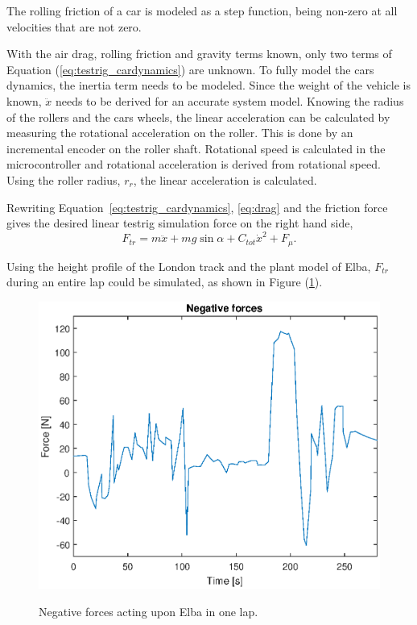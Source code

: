 The rolling friction of a car is modeled as a step function, being non-zero at
all velocities that are not zero.

With the air drag, rolling friction and gravity terms known, only two terms of
Equation (\ref{eq:testrig_cardynamics}) are unknown. To fully model the cars
dynamics, the inertia term needs to be modeled. Since the weight of the vehicle
is known, $\ddot{x}$ needs to be derived for an accurate system model.
Knowing the radius of the rollers and the cars wheels, the linear acceleration
can be calculated by measuring the rotational acceleration on the roller. This
is done by an incremental encoder on the roller shaft. Rotational speed is
calculated in the microcontroller and rotational acceleration is derived from
rotational speed. Using the roller radius, $r_{r}$, the linear acceleration
is calculated.

Rewriting Equation~\ref{eq:testrig_cardynamics}, \ref{eq:drag} and the friction force gives the
desired linear testrig simulation force on the right hand side,
\begin{equation} \label{eq:simulationforce}
    F_{tr} = m\ddot{x} + mg\sin{\alpha} + C_{tot}\dot{x}^2 + F_{\mu}.
\end{equation}

Using the height profile of the London track and the plant model of Elba, $F_{tr}$ during an entire lap could be simulated, as shown in Figure (\ref{fig:testrig_negative_forces}).

\begin{figure}[H]
    \centering\label{fig:testrig_negative_forces}
    \includegraphics[width=\textwidth]{./img/testrig_negative_forces.eps}
    \caption{Negative forces acting upon Elba in one lap.}
\end{figure}


